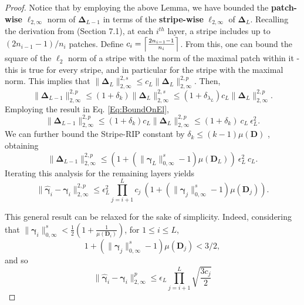 \documentclass[10pt,journal]{IEEEtran}
\def\D{{\mathbf D}}
\def\gama{{\boldsymbol \gamma}}
\def\Delt{{\boldsymbol \Delta}}
\theoremstyle{plain}
\theoremstyle{definition}
\begin{document}
\begin{proof}
	Notice that by employing the above Lemma, we have bounded the \textbf{patch-wise} $\ell_{2,\infty}$ norm of $\Delt_{L-1}$ in terms of the \textbf{stripe-wise} $\ell_{2,\infty}$ of $\Delt_{L}$. %
	Recalling the derivation from \cite{Papyan2016convolutional} (Section 7.1), at each $i^{th}$ layer, a stripe includes up to $(2n_{i-1}-1)/n_i$ patches. Define $c_i = \Bigl\lceil \frac{2n_{i-1}-1}{n_i} \Bigr\rceil$. From this, one can bound the square of the $\ell_2$ norm of a stripe with the norm of the maximal patch within it - this is true for every stripe, and in particular for the stripe with the maximal norm. This implies that $\| \Delt_{L} \|^{2,s}_{2,\infty} \leq c_{L} \| \Delt_{L} \|^{2,p}_{2,\infty}$. Then, 
	\begin{equation}
	\| \Delt_{L-1} \|^{2,p}_{2,\infty} \leq (1+\delta_k) \| \Delt_{L} \|^{2,s}_{2,\infty} \leq (1+\delta_{\lambda_L}) c_{L} \| \Delt_{L} \|^{2,p}_{2,\infty}.
	\end{equation}
	Employing the result in Eq. \eqref{Eq:BoundOnEl},
	\begin{equation}
	\| \Delt_{L-1} \|^{2,p}_{2,\infty} \leq (1+\delta_k) c_L \| \Delt_{L} \|^{2,p}_{2,\infty} \leq  (1+\delta_k)\ c_L \ \epsilon_L^2.
	\end{equation}
	We can further bound the Stripe-RIP constant by $\delta_k \leq (k-1)\mu(\D)$ \cite{WorkingLocallyThinkingGlobally}, obtaining
	\begin{equation}
	\| \Delt_{L-1} \|^{2,p}_{2,\infty} \leq (1+ (\|\gama_L\|^s_{0,\infty}-1)\mu(\D_L) ) \ \epsilon^2_L \ c_L.
	\end{equation}
	Iterating this analysis for the remaining layers yields
	\begin{equation}
	\|\hat{\gama}_i - \gama_i\|^{2,p}_{2,\infty} \leq \epsilon_L^2  \displaystyle\prod\limits_{j=i+1}^{L} c_j\ (1 + (\|\gama_j\|^s_{0,\infty} -1)\mu(\D_{j})).
	\end{equation}
	
	This general result can be relaxed for the sake of simplicity. Indeed, considering that $\|\gama_i\|^s_{0,\infty} < \frac{1}{2}\left(1+\frac{1}{\mu(\D_i)}\right)$, for $1\leq i \leq L$, 
	\begin{equation}
	1 + (\|\gama_j\|^s_{0,\infty} -1)\mu(\D_{j}) < 3/2,
	\end{equation}
	and so 
	\begin{equation}
	\|\hat{\gama}_i - \gama_i\|^p_{2,\infty} \leq \epsilon_L  \displaystyle\prod\limits_{j=i+1}^{L} \sqrt{\frac{3 c_j}{2}}
	\end{equation}
\end{proof}
\end{document}
